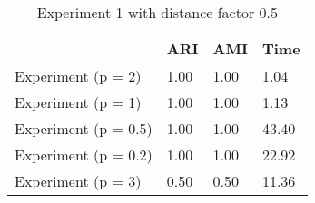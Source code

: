 \begin{table}
\centering
\caption{Experiment 1 with distance factor 0.5}
\begin{tabular}{llll}
\toprule
{} &   ARI &   AMI &   Time \\
\midrule
Experiment (p = 2)   &  1.00 &  1.00 &   1.04 \\
Experiment (p = 1)   &  1.00 &  1.00 &   1.13 \\
Experiment (p = 0.5) &  1.00 &  1.00 &  43.40 \\
Experiment (p = 0.2) &  1.00 &  1.00 &  22.92 \\
Experiment (p = 3)   &  0.50 &  0.50 &  11.36 \\
\bottomrule
\end{tabular}
\end{table}
